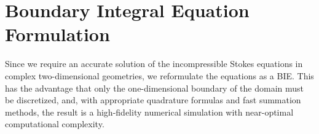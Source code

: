 \documentclass{jfm}
\begin{document}
\section{Boundary Integral Equation Formulation}
\label{sec:DLP}
Since we require an accurate solution of the incompressible Stokes
equations in complex two-dimensional geometries, we reformulate the
equations as a BIE.  This has the advantage that only the
one-dimensional boundary of the domain must be discretized, and, with
appropriate quadrature formulas and fast summation methods, the result
is a high-fidelity numerical simulation with near-optimal computational
complexity.

\end{document}
